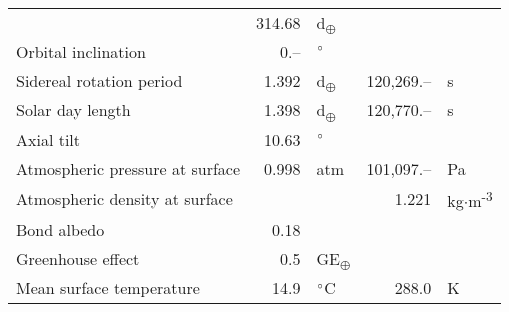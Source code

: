\begin{tabular}{|p{4cm}|r l|r l|}
  & 314.68 & d\textsubscript{$\oplus$} & & \\
  Orbital inclination & 0.-- & $\degree$ & & \\
  Sidereal rotation period & 1.392 & d\textsubscript{$\oplus$} & 120,269.-- & s \\
  Solar day length & 1.398 & d\textsubscript{$\oplus$} & 120,770.-- & s \\
  Axial tilt & 10.63 & $\degree$ & & \\
  Atmospheric pressure at surface & 0.998 & atm & 101,097.-- & Pa \\
  Atmospheric density at surface & & & 1.221 & kg$\cdot$m\textsuperscript{-3} \\
  Bond albedo & 0.18 & & & \\
  Greenhouse effect & 0.5 & GE\textsubscript{$\oplus$} & & \\
  Mean surface temperature & 14.9 & $\degree$C & 288.0 & K \\
  \hline
\end{tabular}
\newpage
